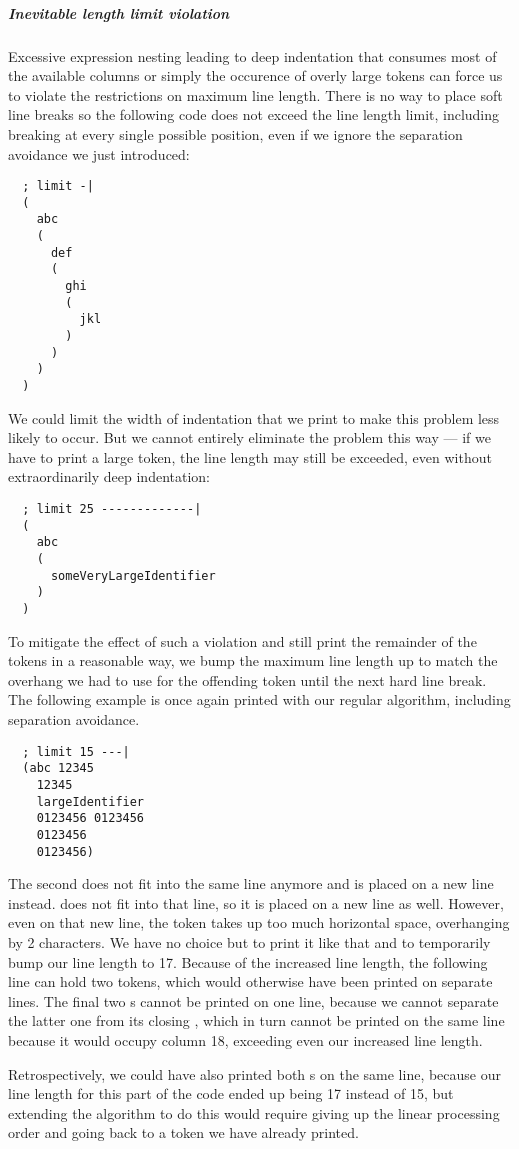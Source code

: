 \subparagraph{Inevitable length limit violation}
Excessive expression nesting leading to deep indentation
that consumes most of the available columns
or simply the occurence of overly large tokens
can force us to violate the restrictions on maximum line length.
There is no way to place soft line breaks so
the following code does not exceed the line length limit,
including breaking at every single possible position,
even if we ignore the separation avoidance we just introduced:
\begin{verbatim}
  ; limit -|
  (
    abc
    (
      def
      (
        ghi
        (
          jkl
        )
      )
    )
  )
\end{verbatim}
We could limit the width of indentation that we print to make this problem less likely to occur.
But we cannot entirely eliminate the problem this way ---
if we have to print a large token, the line length may still be exceeded,
even without extraordinarily deep indentation:
\begin{verbatim}
  ; limit 25 -------------|
  (
    abc
    (
      someVeryLargeIdentifier
    )
  )
\end{verbatim}

To mitigate the effect of such a violation and still
print the remainder of the tokens in a reasonable way,
we bump the maximum line length up to match
the overhang we had to use for the offending token
until the next hard line break.
The following example is once again printed with our regular algorithm,
including separation avoidance.
\begin{verbatim}
  ; limit 15 ---|
  (abc 12345
    12345
    largeIdentifier
    0123456 0123456
    0123456
    0123456)
\end{verbatim}
The second  does not fit into the same line anymore and is placed on a new line instead.
 does not fit into that line, so it is placed on a new line as well.
However, even on that new line,
the token takes up too much horizontal space, overhanging by 2 characters.
We have no choice but to print it like that and to temporarily bump our line length to 17.
Because of the increased line length, the following line can hold two  tokens,
which would otherwise have been printed on separate lines.
The final two s cannot be printed on one line,
because we cannot separate the latter one from its closing ,
which in turn cannot be printed on the same line because it would occupy column 18,
exceeding even our increased line length.

Retrospectively, we could have also printed both s on the same line,
because our line length for this part of the code ended up being 17 instead of 15,
but extending the algorithm to do this would require giving up the linear processing order
and going back to a token we have already printed.
